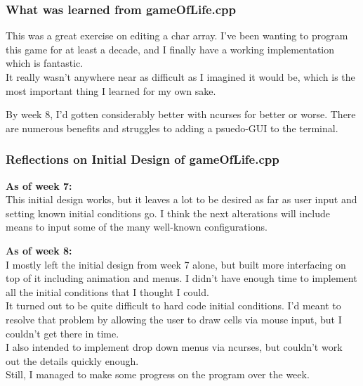 \documentclass[11pt, oneside]{memoir}
\begin{document}
\subsubsection{What was learned from gameOfLife.cpp}

This was a great exercise on editing a char array.  I've been wanting
to program this game for at least a decade, and I finally have a
working implementation which is fantastic.  \\

It really wasn't anywhere near as difficult as I imagined it would
be, which is the most important thing I learned for my own sake.  

By week 8, I'd gotten considerably better with ncurses for better or
worse.  There are numerous benefits and struggles to adding a
psuedo-GUI to the terminal. 

\subsubsection{Reflections on Initial Design of gameOfLife.cpp}

\textbf{As of week 7:} \\
This initial design works, but it leaves a lot to be desired as far as
user input and setting known initial conditions go.   I think the next
alterations will include means to input some of the many well-known
configurations. 

\textbf{As of week 8:} \\
I mostly left the initial design from week 7 alone, but built more
interfacing on top of it including animation and menus.   I didn't
have enough time to implement all the initial conditions that I
thought I could.   \\

It turned out to be quite difficult to hard code initial conditions.
I'd meant to resolve that problem by allowing the user to draw cells
via mouse input, but I couldn't get there in time. \\

I also intended to implement drop down menus via ncurses, but couldn't
work out the details quickly enough.\\


Still, I managed to make some progress on the program over the week. 





\end{document}
